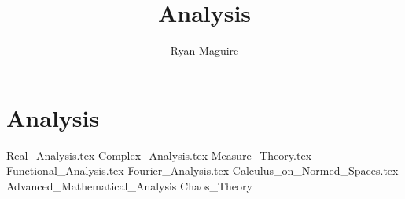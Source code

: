 \documentclass[crop=false,class=book,oneside]{standalone}
\begin{document}
    \ifx\ifmain\undefined
        \newif\ifmain
        \title{Analysis}
        \author{Ryan Maguire}
        \date{\vspace{-5ex}}
        \maketitle
        \tableofcontents
        \listoffigures
        \listoftables
        \clearpage
    \fi
    \part{Analysis}
        {Real_Analysis.tex}
        {Complex_Analysis.tex}
        {Measure_Theory.tex}
        {Functional_Analysis.tex}
        {Fourier_Analysis.tex}
        {Calculus_on_Normed_Spaces.tex}
        {Advanced_Mathematical_Analysis}
        {Chaos_Theory}
\end{document}

